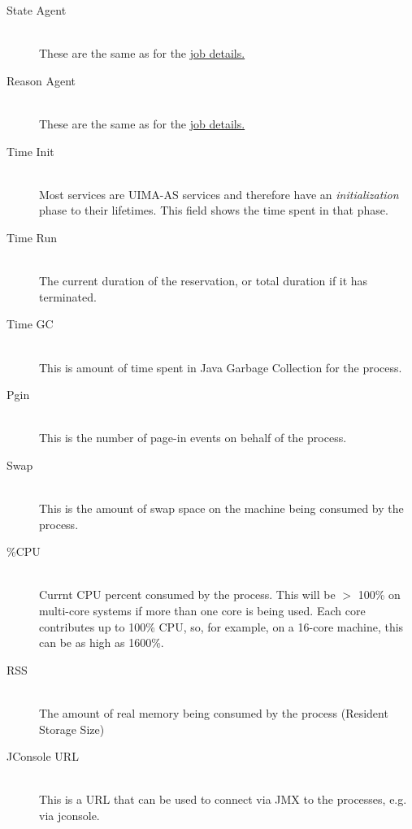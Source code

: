 \begin{description}
      \item[State Agent] \hfill \\
        These are the same as for the \hyperref[itm:job-details-state]{job details.}

      \item[Reason Agent] \hfill \\
        These are the same as for the \hyperref[itm:job-details-agent]{job details.}


      \item[Time Init] \hfill \\
        Most services are UIMA-AS services and therefore have an {\em initialization} phase
        to their lifetimes.  This field shows the time spent in that phase.

      \item[Time Run] \hfill \\
        The current duration of the reservation, or total duration if it has 
        terminated.
        
      \item[Time GC] \hfill \\
        This is amount of time spent in Java Garbage Collection for the process.

      \item[Pgin] \hfill \\
        This is the number of page-in events on behalf of the process.
        
      \item[Swap] \hfill \\
        This is the amount of swap space on the machine being consumed by the process.
        
      \item[\%CPU] \hfill \\
        Currnt CPU percent consumed by the process.  This will be $>$ 100\% on 
        multi-core systems if more than one core is being used.  Each core contributes
        up to 100\% CPU, so, for example, on a 16-core machine, this can be as high
        as 1600\%.

      \item[RSS] \hfill \\
        The amount of real memory being consumed by the process (Resident Storage Size)

      \item[JConsole URL] \hfill \\
        This is a URL that can be used to connect via JMX to the processes, e.g. via
        jconsole.

   \end{description}


